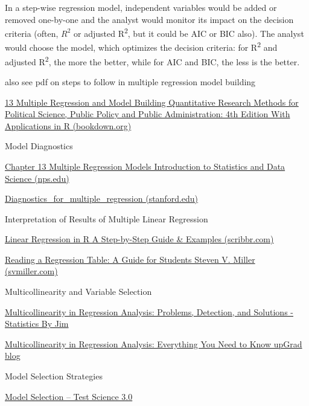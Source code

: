 \documentclass[
  letterpaper,
  paper =a4,
  twoside,
  openright,
  headsepline,
  footsepline,
  listof = totocnumbered,
  chapterprefix = true,
  firstiscover,
  parskip = full*]{scrbook}
\begin{document}
In a step-wise regression model, independent variables would be added or
removed one-by-one and the analyst would monitor its impact on the
decision criteria (often, \(R^2\) or adjusted R\textsuperscript{2}, but
it could be AIC or BIC also). The analyst would choose the model, which
optimizes the decision criteria: for R\textsuperscript{2} and adjusted
R\textsuperscript{2}, the more the better, while for AIC and BIC, the
less is the better.

also see pdf on steps to follow in multiple regression model building

\href{https://bookdown.org/ripberjt/qrmbook/multiple-regression-and-model-building.html}{13
Multiple Regression and Model Building \textbar{} Quantitative Research
Methods for Political Science, Public Policy and Public Administration:
4th Edition With Applications in R (bookdown.org)}

Model Diagnostics

\href{https://faculty.nps.edu/rbassett/_book/multiple-regression-models.html}{Chapter
13 Multiple Regression Models \textbar{} Introduction to Statistics and
Data Science (nps.edu)}

\href{https://web.stanford.edu/class/stats191/notebooks/Diagnostics_for_multiple_regression.html}{Diagnostics\_for\_multiple\_regression
(stanford.edu)}

Interpretation of Results of Multiple Linear Regression

\href{https://www.scribbr.com/statistics/linear-regression-in-r/}{Linear
Regression in R \textbar{} A Step-by-Step Guide \& Examples
(scribbr.com)}

\href{http://svmiller.com/blog/2014/08/reading-a-regression-table-a-guide-for-students/}{Reading
a Regression Table: A Guide for Students \textbar{} Steven V. Miller
(svmiller.com)}

Multicollinearity and Variable Selection

\href{https://statisticsbyjim.com/regression/multicollinearity-in-regression-analysis/}{Multicollinearity
in Regression Analysis: Problems, Detection, and Solutions - Statistics
By Jim}

\href{https://www.upgrad.com/blog/multicollinearity-in-regression-analysis/}{Multicollinearity
in Regression Analysis: Everything You Need to Know \textbar{} upGrad
blog}

Model Selection Strategies

\href{https://testscience.org/analyze-test-data/inferential/benefits-of-statistical-modeling/model-selection/\#:~:text=There\%20are\%20several\%20model\%20building\%20strategies\%20available\%20using,to\%20regularization\%20approaches\%20\%28ridge\%20regression\%2C\%20LASSO\%2C\%20elastic\%20net\%29.}{Model
Selection -- Test Science 3.0}
\end{document}
